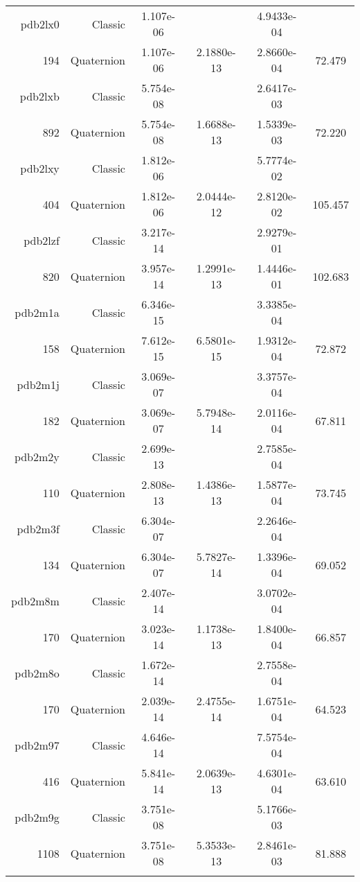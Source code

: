 \begin{xltabular}{\textwidth}{r|rS[table-format=1.3e+2]S[table-format=1.4e+2]S[table-format=1.4e+2]S[table-format=-1.3]}
pdb2lx0 & Classic & 1.107e-06 &  & 4.9433e-04 & \\
194 & Quaternion & 1.107e-06 & 2.1880e-13 & 2.8660e-04 & 72.479\\  \addlinespace
pdb2lxb & Classic & 5.754e-08 &  & 2.6417e-03 & \\
892 & Quaternion & 5.754e-08 & 1.6688e-13 & 1.5339e-03 & 72.220\\  \addlinespace
pdb2lxy & Classic & 1.812e-06 &  & 5.7774e-02 & \\
404 & Quaternion & 1.812e-06 & 2.0444e-12 & 2.8120e-02 & 105.457\\  \addlinespace
pdb2lzf & Classic & 3.217e-14 &  & 2.9279e-01 & \\
820 & Quaternion & 3.957e-14 & 1.2991e-13 & 1.4446e-01 & 102.683\\  \addlinespace
pdb2m1a & Classic & 6.346e-15 &  & 3.3385e-04 & \\
158 & Quaternion & 7.612e-15 & 6.5801e-15 & 1.9312e-04 & 72.872\\  \addlinespace
pdb2m1j & Classic & 3.069e-07 &  & 3.3757e-04 & \\
182 & Quaternion & 3.069e-07 & 5.7948e-14 & 2.0116e-04 & 67.811\\  \addlinespace
pdb2m2y & Classic & 2.699e-13 &  & 2.7585e-04 & \\
110 & Quaternion & 2.808e-13 & 1.4386e-13 & 1.5877e-04 & 73.745\\  \addlinespace
pdb2m3f & Classic & 6.304e-07 &  & 2.2646e-04 & \\
134 & Quaternion & 6.304e-07 & 5.7827e-14 & 1.3396e-04 & 69.052\\  \addlinespace
pdb2m8m & Classic & 2.407e-14 &  & 3.0702e-04 & \\
170 & Quaternion & 3.023e-14 & 1.1738e-13 & 1.8400e-04 & 66.857\\  \addlinespace
pdb2m8o & Classic & 1.672e-14 &  & 2.7558e-04 & \\
170 & Quaternion & 2.039e-14 & 2.4755e-14 & 1.6751e-04 & 64.523\\  \addlinespace
pdb2m97 & Classic & 4.646e-14 &  & 7.5754e-04 & \\
416 & Quaternion & 5.841e-14 & 2.0639e-13 & 4.6301e-04 & 63.610\\  \addlinespace
pdb2m9g & Classic & 3.751e-08 &  & 5.1766e-03 & \\
1108 & Quaternion & 3.751e-08 & 5.3533e-13 & 2.8461e-03 & 81.888\\  \addlinespace

\end{xltabular}
